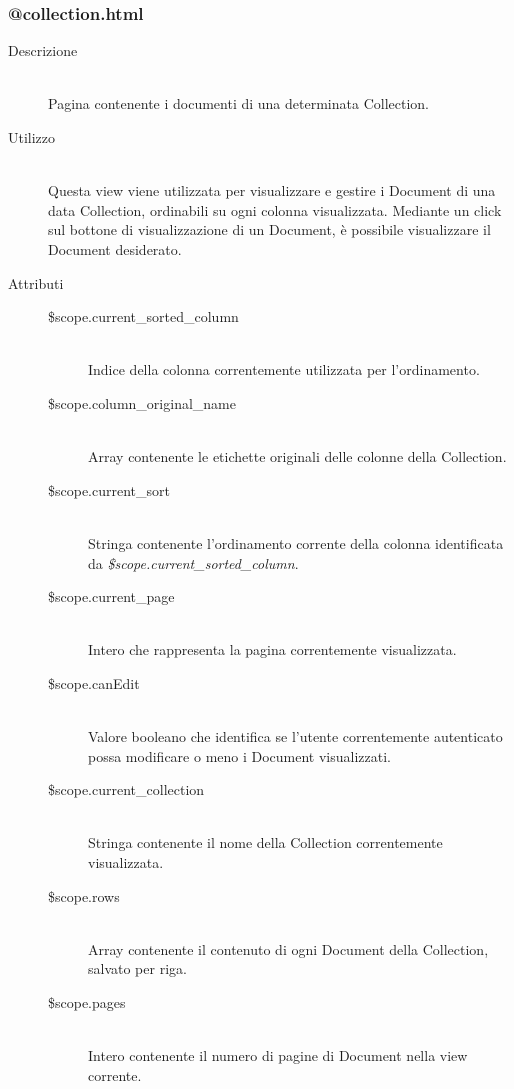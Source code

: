 \subsubsection{@collection.html}
\begin{description}
	\item[Descrizione] \hfill \\
	Pagina contenente i documenti di una determinata Collection.
	\item[Utilizzo] \hfill \\
	Questa view viene utilizzata per visualizzare e gestire i Document di una data Collection, ordinabili su ogni colonna visualizzata. Mediante un click sul bottone di visualizzazione di un Document, è possibile visualizzare il Document desiderato.
	\item[Attributi] \hfill
	\begin{description}
		\item[\$scope.current\_sorted\_column] \hfill \\
		Indice della colonna correntemente utilizzata per l'ordinamento.
		\item[\$scope.column\_original\_name] \hfill \\
		Array contenente le etichette originali delle colonne della Collection.
		\item[\$scope.current\_sort] \hfill \\
		Stringa contenente l'ordinamento corrente della colonna identificata da \textit{\$scope.current\_sorted\_column}.
		\item[\$scope.current\_page] \hfill \\
		Intero che rappresenta la pagina correntemente visualizzata.
		\item[\$scope.canEdit] \hfill \\
		Valore booleano che identifica se l'utente correntemente autenticato possa modificare o meno i Document visualizzati.
		\item[\$scope.current\_collection] \hfill \\
		Stringa contenente il nome della Collection correntemente visualizzata.
		\item[\$scope.rows] \hfill \\
		Array contenente il contenuto di ogni Document della Collection, salvato per riga.
		\item[\$scope.pages] \hfill \\
		Intero contenente il numero di pagine di Document nella view corrente.
	\end{description}
 	
\end{description}

